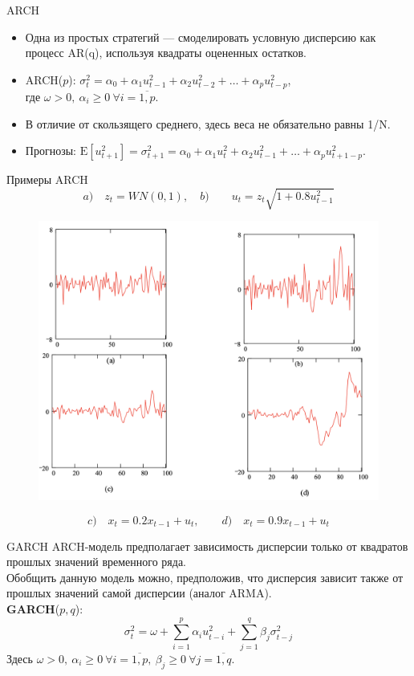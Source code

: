 \begin{frame}{ARCH}
\begin{itemize}
\item  Одна из простых стратегий --- смоделировать условную дисперсию как процесс AR(q), используя квадраты оцененных остатков.
\item ARCH($p$): $ \sigma_t^2 = \alpha_0 + \alpha_1 u_{t-1}^2 + \alpha_2 u_{t-2}^2 + \dots + \alpha_p u_{t-p}^2 $,\\
где $\omega > 0, \ \alpha_i \geq 0 \ \forall i = \overline{1, p}$.
\item В отличие от скользящего среднего, здесь веса не обязательно равны 1/N.
\item Прогнозы: $ \mathrm{E}[u_{t+1}^2] = \sigma_{t+1}^2 = \alpha_0 + \alpha_1 u_{t}^2 + \alpha_2 u_{t-1}^2 + \dots + \alpha_p u_{t+1-p}^2 $.
\end{itemize}
\end{frame}
\begin{frame}{Примеры ARCH}
$$a)\quad z_t = WN(0,1),\quad b)\quad \quad u_t = z_t\sqrt{1 + 0.8u_{t-1}^2}$$
\begin{figure}
    \centering
    \includegraphics[width=0.7\linewidth]{lecture_3/fig/arch_example.png}
\end{figure}
$$c)\quad x_t = 0.2x_{t-1} + u_t,\quad \quad d)\quad x_t = 0.9x_{t-1} + u_t$$
\end{frame}
\begin{frame}{GARCH}
ARCH-модель предполагает зависимость дисперсии только от квадратов прошлых значений временного ряда.\\
\vspace{0.3cm}
Обобщить данную модель можно, предположив, что дисперсия зависит также от прошлых значений самой дисперсии (аналог ARMA).\\
\vspace{0.3cm}
\textbf{GARCH}($p, q$):
$$ \sigma_t^2 = \omega + \sum_{i=1}^p \alpha_i u_{t-i}^2 + \sum_{j=1}^q \beta_j \sigma_{t-j}^2$$
Здесь $\omega > 0, \ \alpha_i \geq 0 \ \forall i = \overline{1, p}, \ \beta_j \geq 0 \ \forall j = \overline{1, q}$. 
\end{frame}
